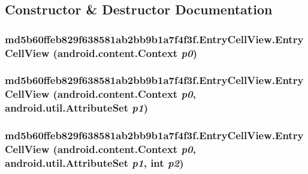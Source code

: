 \subsection{Constructor \& Destructor Documentation}
\hypertarget{classmd5b60ffeb829f638581ab2bb9b1a7f4f3f_1_1_entry_cell_view_dbbaf6527f6daa54b8c17455243a5806}{
\subsubsection[{EntryCellView}]{\setlength{\rightskip}{0pt plus 5cm}md5b60ffeb829f638581ab2bb9b1a7f4f3f.EntryCellView.EntryCellView (android.content.Context {\em p0})}}
\label{classmd5b60ffeb829f638581ab2bb9b1a7f4f3f_1_1_entry_cell_view_dbbaf6527f6daa54b8c17455243a5806}


\hypertarget{classmd5b60ffeb829f638581ab2bb9b1a7f4f3f_1_1_entry_cell_view_34f28cd0cc7b56ce0ac2064e7138170b}{
\subsubsection[{EntryCellView}]{\setlength{\rightskip}{0pt plus 5cm}md5b60ffeb829f638581ab2bb9b1a7f4f3f.EntryCellView.EntryCellView (android.content.Context {\em p0}, \/  android.util.AttributeSet {\em p1})}}
\label{classmd5b60ffeb829f638581ab2bb9b1a7f4f3f_1_1_entry_cell_view_34f28cd0cc7b56ce0ac2064e7138170b}


\hypertarget{classmd5b60ffeb829f638581ab2bb9b1a7f4f3f_1_1_entry_cell_view_2b0135e0b61be293bb38a6ac7d2c9b3f}{
\subsubsection[{EntryCellView}]{\setlength{\rightskip}{0pt plus 5cm}md5b60ffeb829f638581ab2bb9b1a7f4f3f.EntryCellView.EntryCellView (android.content.Context {\em p0}, \/  android.util.AttributeSet {\em p1}, \/  int {\em p2})}}
\label{classmd5b60ffeb829f638581ab2bb9b1a7f4f3f_1_1_entry_cell_view_2b0135e0b61be293bb38a6ac7d2c9b3f}


